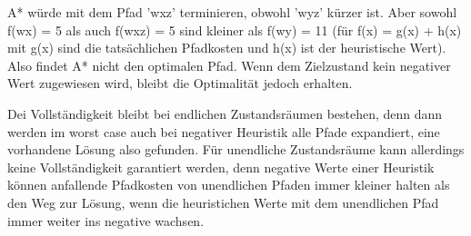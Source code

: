\documentclass[a4paper,10pt]{article}
\begin{document}
\begin{enumerate}[~~a)]
\begin{center}
        \end{center}

A* würde mit dem Pfad 'wxz' terminieren, obwohl 'wyz' kürzer ist. Aber sowohl f(wx) = 5 als auch f(wxz) = 5 sind kleiner als f(wy) = 11 (für f(x) = g(x) + h(x) mit g(x) sind die tatsächlichen Pfadkosten und h(x) ist der heuristische Wert). Also findet A* nicht den optimalen Pfad. Wenn dem Zielzustand kein negativer Wert zugewiesen wird, bleibt die Optimalität jedoch erhalten.

Dei Vollständigkeit bleibt bei endlichen Zustandsräumen bestehen, denn dann werden im worst case auch bei negativer Heuristik alle Pfade expandiert, eine vorhandene Lösung also gefunden. Für unendliche Zustandsräume kann allerdings keine Vollständigkeit garantiert werden, denn negative Werte einer Heuristik können anfallende Pfadkosten von unendlichen Pfaden immer kleiner halten als den Weg zur Lösung, wenn die heuristichen Werte mit dem unendlichen Pfad immer weiter ins negative wachsen.
\end{enumerate}
\end{document}
